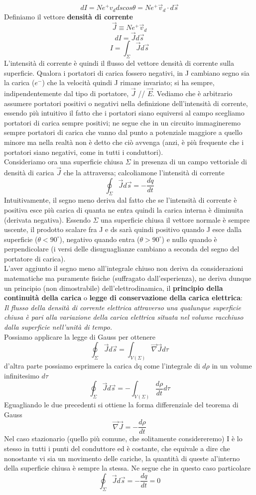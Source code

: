 \documentclass[10pt,a4paper]{article}
\begin{document}
\[dI = N e^+ v_d ds cos\theta = N e^+ \vec{v}_d\cdot d\vec{s}\]
Definiamo il vettore \textbf{densità di corrente}
\[\vec{J} \equiv N e^+ \vec{v}_d\]
\[dI = \vec{J}d\vec{s}\]
\[I = \int_{\Sigma} \vec{J}d\vec{s}\]
L'intensità di corrente è quindi il flusso del vettore densità di corrente sulla superficie. Qualora i portatori di carica fossero negativi, in J cambiano segno sia la carica (\(e^-\)) che la velocità quindi J rimane invariato; si ha sempre, indipendentemente dal tipo di portatore, \(\vec{J}\) // $\vec{E}$. Vediamo che è arbitrario assumere portatori positivi o negativi nella definizione dell'intensità di corrente, essendo più intuitivo il fatto che i portatori siano equiversi al campo scegliamo portatori di carica sempre positivi; ne segue che in un circuito immagineremo sempre portatori di carica che vanno dal punto a potenziale maggiore a quello minore ma nella realtà non è detto che ciò avvenga (anzi, è più frequente che i portatori siano negativi, come in tutti i conduttori). \\
Consideriamo ora una superficie chiusa $\Sigma$ in presenza di un campo vettoriale di densità di carica $\vec{J}$ che la attraversa; calcoliamone l'intensità di corrente
\[\oint_\Sigma \vec{J}d\vec{s} = -\frac{dq}{dt}\]
Intuitivamente, il segno meno deriva dal fatto che se l'intensità di corrente è positiva esce più carica di quanta ne entra quindi la carica interna è diminuita (derivata negativa). Essendo $\Sigma$ una superficie chiusa il vettore normale è sempre uscente, il prodotto scalare fra J e ds sarà quindi positivo quando J esce dalla superficie ($\theta<90^\circ$), negativo quando entra ($\theta>90^\circ$) e nullo quando è perpendicolare (i versi delle disuguaglianze cambiano a seconda del segno del portatore di carica).\\
L'aver aggiunto il segno meno all'integrale chiuso non deriva da considerazioni matematiche ma puramente fisiche (suffragato dall'esperienza), ne deriva dunque un principio (non dimostrabile) dell'elettrodinamica, il \textbf{principio della continuità della carica} o \textbf{legge di conservazione della carica elettrica}:\\
\textit{Il flusso della densità di corrente elettrica attraverso una qualunque superficie chiusa è pari alla variazione della carica elettrica situata nel volume racchiuso dalla superficie nell'unità di tempo.}\\
Possiamo applicare la legge di Gauss per ottenere
\[\oint_\Sigma \vec{J}d\vec{s} = \int_{V(\Sigma)} \vec{\nabla}\vec{J} d\tau\]
d'altra parte possiamo esprimere la carica dq come l'integrale di \(d\rho\) in un volume infinitesimo \(d\tau\) 
\[\oint_\Sigma \vec{J}d\vec{s} = -\int_{V(\Sigma)}\frac{d\rho}{dt}d\tau\]
Eguagliando le due precedenti si ottiene la forma differenziale del teorema di Gauss
\[\vec{\nabla}\vec{J} = -\frac{d\rho}{dt}\]
Nel caso stazionario (quello più comune, che solitamente considereremo) I è lo stesso in tutti i punti del conduttore ed è costante, che equivale a dire che nonostante vi sia un movimento delle cariche, la quantità di queste al'interno della superficie chiusa è sempre la stessa. Ne segue che in questo caso particolare 
\[\oint_\Sigma \vec{J}d\vec{s} = -\frac{dq}{dt} = 0\]
\end{document}
